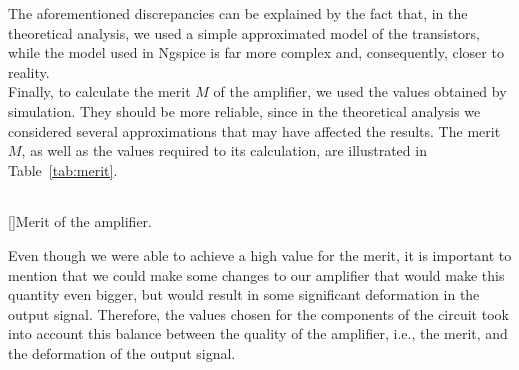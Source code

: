 The aforementioned discrepancies can be explained by the fact that, in the theoretical analysis, we used a simple approximated model of the transistors, while the model used in Ngspice is far more complex and, consequently, closer to reality.\\

Finally, to calculate the merit $M$ of the amplifier, we used the values obtained by simulation. They should be more reliable, since in the theoretical analysis we considered several approximations that may have affected the results. The merit $M$, as well as the values required to its calculation, are illustrated in Table~\ref{tab:merit}.

\vspace{2mm}

\begin{center}
\begin{tabular}{ | c | c | }\hline
 
\end{tabular}
[]{Merit of the amplifier.}
\label{tab:merit}
\end{center}

Even though we were able to achieve a high value for the merit, it is important to mention that we could make some changes to our amplifier that would make this quantity even bigger, but would result in some significant deformation in the output signal. Therefore, the values chosen for the components of the circuit took into account this balance between the quality of the amplifier, i.e., the merit, and the deformation of the output signal.
